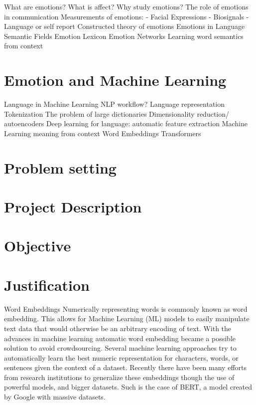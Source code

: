 What are emotions?
What is affect?
Why study emotions?
The role of emotions in communication
Measurements of emotions:
 - Facial Expressions
 - Biosignals
 - Language or self report
Constructed theory of emotions
Emotions in Language
Semantic Fields
Emotion Lexicon
Emotion Networks
Learning word semantics from context

\section{Emotion and Machine Learning}
\label{sec:Emotion and Machine Learning}
Language in Machine Learning
NLP workflow?
Language representation
Tokenization
The problem of large dictionaries
Dimensionality reduction/ autoencoders
Deep learning for language: automatic feature extraction
Machine Learning meaning from context
Word Embeddings
Transformers




\section{Problem setting}
\label{sec:Problem setting}


\section{Project Description}
\label{sec:Project Description}


\section{Objective}
\label{sec:Objective}


\section{Justification}
\label{sec:Justification}

Word Embeddings
Numerically representing words is commonly known as word embedding. This allows for Machine Learning (ML) models to easily manipulate text data that would otherwise be an arbitrary encoding of text. With the advances in machine learning automatic word embedding became a possible solution to avoid crowdsourcing. %
Several machine learning approaches try to automatically learn the best numeric representation for characters, words, or sentences given the context of a dataset. Recently there have been many efforts from research institutions to generalize these embeddings though the use of powerful models, and bigger datasets. Such is the case of BERT, a model created by Google with massive datasets.

